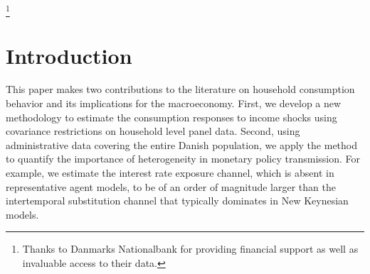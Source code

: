 \documentclass[titlepage]{\econtex}\newcommand{\texname}{ConsumptionHeterogeneity}
\begin{document}
\begin{authorsinfo}
\end{authorsinfo}
\thanks{Thanks to Danmarks Nationalbank for providing financial support as well as invaluable access to their data.}

\titlepagefinish
\setcounter{page}{1}

\pagebreak
\section{Introduction}
This paper makes two contributions to the literature on household consumption behavior and its implications for the macroeconomy. First, we develop a new methodology to estimate the consumption responses to income shocks using covariance restrictions on household level panel data. Second, using administrative data covering the entire Danish population, we apply the method to quantify the importance of heterogeneity in monetary policy transmission. For example, we estimate the interest rate exposure channel, which is absent in representative agent models, to be of an order of magnitude larger than the intertemporal substitution channel that typically dominates in New Keynesian models.
\end{document}
